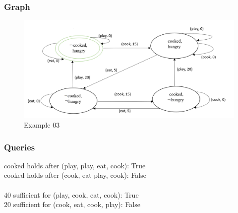 \documentclass[11pt]{article}
\begin{document}
	\subsubsection{Graph}\label{par:p403}
	\begin{figure}[H]
		\includegraphics[width=1\linewidth, height=0.3\textheight]{./media/figure01.png}
		\caption{Example 03}
		\label{Figure:f03}
	\end{figure}
	\subsubsection{Queries}
	cooked holds after (play, play, eat, cook): True\\
	cooked holds after (cook, eat play, cook): False\\
	\\
	40 sufficient for (play, cook, eat, cook): True\\
	20 sufficient for (cook, eat, cook, play): False\\
\end{document}
